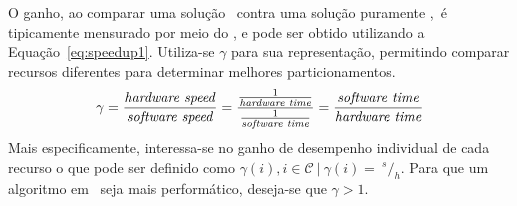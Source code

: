             

            O ganho, ao comparar uma solução \hs\ contra uma solução puramente \software,\ é tipicamente mensurado por meio do \speedup, e pode ser obtido utilizando a Equação~\ref{eq:speedup1}.
            Utiliza-se $ \gamma $ para sua representação, permitindo comparar recursos diferentes para determinar melhores particionamentos.
            \begin{equation}
            \gamma =
            \frac{
            \textnormal{\textit{hardware speed}}
            }{
            \textnormal{\textit{software speed}}
            }
            =
            \frac{
            \frac{
            1
            } {
            \textnormal{\textit{hardware time}}
            }
            } {
            \frac{
            1
            }{
            \textnormal{\textit{software time}}
            }
            }
            =
            \frac{
            \textnormal{\textit{software time}}
            } {
            \textnormal{\textit{hardware time}}
            } \label{eq:speedup1}
            \end{equation}
            Mais especificamente, interessa-se no ganho de desempenho individual de cada recurso o que pode ser definido como $ \gamma(i), i \in \mathcal{C}\ |\ \gamma(i) =\ ^s\!/_h $.
            Para que um algoritmo em \hardware\ seja mais performático, deseja-se que $\gamma > 1$.
